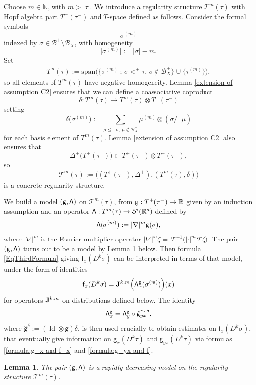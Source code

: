 \documentclass[11pt]{article}
\numberwithin{equation}{section}
\theoremstyle{plain}
\newtheorem{lem}[thm]{Lemma}
\theoremstyle{definition}
\DeclareMathOperator{\iden}{Id}
\newcommand{\sff}{\mathsf{f}}
\newcommand{\sfg}{\mathsf{g}}
\newcommand{\scrT}{\mathscr{T}}
\newcommand{\bbN}{\mathbb{N}}
\newcommand{\bbR}{\mathbb{R}}
\newcommand{\mcB}{\mathcal{B}}
\newcommand{\mcF}{\mathcal{F}}
\begin{document}
Choose $m\in\bbN$, with $m>\vert\tau\vert$. We introduce a regularity structure $\scrT^m(\tau)$ with Hopf algebra part $T^+(\tau^-)$ and $T$-space defined as follows.
Consider the formal symbols
\[
\sigma^{(m)}
\]
indexed by $\sigma\in\mcB^+\setminus\mcB_X^+$, with homogeneity
\[
\big|\sigma^{(m)}\big| := |\sigma| - m.
\]
Set
\begin{align*}
T^m(\tau) := \textrm{span}
\bigl(\big\{\sigma^{(m)}\ ;\,\sigma<^+\tau,\, \sigma\notin\mcB_X^+\big\}
\cup\big\{\tau^{(m)}\big\}\bigr),
\end{align*}
so all elements of $T^m(\tau)$ have negative homogeneity.
Lemma \ref{extension of assumption C2} ensures that we can define a coassociative coproduct
\[
\delta: T^m(\tau)\to T^m(\tau)\otimes T^+(\tau^-)
\]
setting
\[
\delta\bigl(\sigma^{(m)}\bigr) := \sum_{\mu\leq^+\sigma,\,\mu\notin\mcB_X^+} \mu^{(m)}\otimes(\sigma/^+\mu)
\]
for each basis element of $T^m(\tau)$.
Lemma \ref{extension of assumption C2} also ensures that
\[
\Delta^+\bigl(T^+(\tau^-)\bigr) \subset T^+(\tau^-)\otimes T^+(\tau^-),
\]
so
\[
\scrT^m(\tau) := \bigl((T^+(\tau^-),\Delta^+), (T^m(\tau),\delta)\bigr)
\]
is a concrete regularity structure.

We build a model $\sf (g,\Lambda)$ on $\scrT^m(\tau)$, from ${\sf g} : T^+(\tau^-)\to\bbR$ given by an induction assumption and an operator ${\sf\Lambda}:T^m(\tau)\to\mathcal{S}'(\mathbb{R}^d)$ defined by
\[
{\sf\Lambda}(\sigma^{(m)}) := |\nabla|^m {\sf g}(\sigma),
\]
where $|\nabla|^m$ is the Fourier multiplier operator $|\nabla|^m\zeta = \mcF^{-1}\bigl(|{\cdot}|^m\mcF\zeta\bigr)$.
The pair $\sf(g,\Lambda)$ turns out to be a model by Lemma \ref{lem:model on T^M} below. Then formula \eqref{EqThirdFormula} giving $\sff_x(D^k\sigma)$ can be interpreted in terms of that model, under the form of identities
\[
\sff_x(D^k\sigma) = {\bf J}^{k,m}\Bigl({\sf \Lambda}^\sfg_x(\sigma^{(m)})\Bigr)(x)
\]
for operators ${\bf J}^{k,m}$ on distributions defined below. The identity
\[
{\sf \Lambda}^\sfg_x = {\sf \Lambda}^\sfg_y \circ\widehat{\sfg_{yx}}^\delta,
\]
where $\widehat{\sfg}^\delta := (\iden\otimes \sfg)\delta$, is then used crucially to obtain estimates on $\sff_x(D^k\sigma)$, that eventually give information on $\sfg_x(D^k\tau)$ and $\sfg_{yx}(D^k\tau)$ via formulas \eqref{formula:g_x and f_x} and \eqref{formula:g_yx and f}.

\begin{lem}\label{lem:model on T^M}
The pair $({\sf g},{\sf\Lambda})$ is a rapidly decreasing model on the regularity structure $\scrT^m(\tau)$.
\end{lem}
\end{document}
